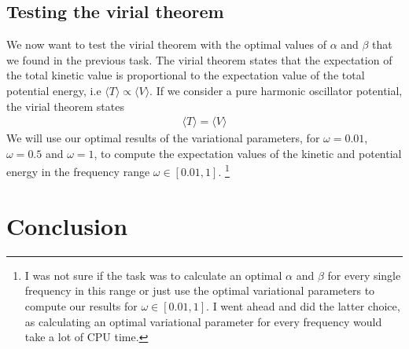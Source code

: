 \documentclass[12pt]{article}
\begin{document}
\subsection{Testing the virial theorem}
We now want to test the virial theorem with the optimal values of $\alpha$ and $\beta$ that we found in the previous  task. The virial theorem states that the expectation of the total kinetic value is proportional to the expectation value of the total potential energy, i.e $\langle T \rangle \propto \langle V \rangle$. If we consider a pure harmonic oscillator potential, the virial theorem states
\begin{align*}
\langle T \rangle = \langle V \rangle
\end{align*}
We will use our optimal results of the variational parameters, for $\omega = 0.01$, $\omega = 0.5$ and $\omega=1$, to compute the expectation values of the kinetic and potential energy in the frequency range $\omega \in [0.01, 1]$. \footnote{I was not sure if the task was to calculate an optimal $\alpha$ and $\beta$ for every single frequency in this range or just use the optimal variational parameters to compute our results for $\omega \in [0.01, 1]$. I went ahead and did the latter choice, as calculating an optimal variational parameter for every frequency would take a lot of CPU time.}
\section{Conclusion}\label{section:conclusion}

\FloatBarrier
\end{document}

